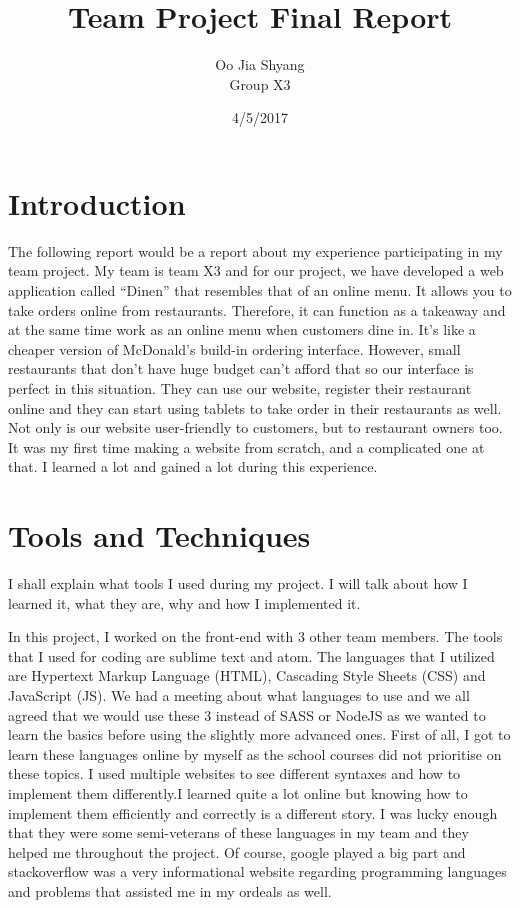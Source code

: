 \documentclass[a4paper]{article}
\begin{document}
\title{\Large\textbf{Team Project Final Report}}
\author {Oo Jia Shyang \\ Group X3}
\date {4/5/2017}
\maketitle
\newpage

\section{Introduction}

The following report would be a report about my experience participating in my team project. My team is team X3 and for our project, we have developed a web application called “Dinen” that resembles that of an online menu. It allows you to take orders online from restaurants. Therefore, it can function as a takeaway and at the same time work as an online menu when customers dine in. It’s like a cheaper version of McDonald’s build-in ordering interface. However, small restaurants that don’t have huge budget can’t afford that so our interface is perfect in this situation. They can use our website, register their restaurant online and they can start using tablets to take order in their restaurants as well. Not only is our website user-friendly to customers, but to restaurant owners too. It was my first time making a website from scratch, and a complicated one at that. I learned a lot and gained a lot during this experience.

\section{Tools and Techniques}\newline
I shall explain what tools I used during my project. I will talk about how I learned it, what they are, why and how I implemented it.
\newline

In this project, I worked on the front-end with 3 other team members. The tools that I used for coding are sublime text and atom. The languages that I utilized are Hypertext Markup Language (HTML), Cascading Style Sheets (CSS) and JavaScript (JS). We had a meeting about what languages to use and we all agreed that we would use these 3 instead of SASS or NodeJS as we wanted to learn the basics before using the slightly more advanced ones. First of all, I got to learn these languages online by myself as the school courses did not prioritise on these topics. I used multiple websites to see different syntaxes and how to implement them differently.I learned quite a lot online but knowing how to implement them efficiently and correctly is a different story. I was lucky enough that they were some semi-veterans of these languages in my team and they helped me throughout the project. Of course, google played a big part and stackoverflow was a very informational website regarding programming languages and problems that assisted me in my ordeals as well.
\newline
\end{document}
